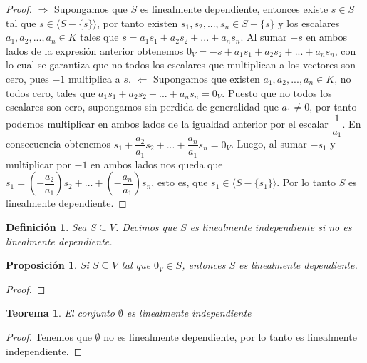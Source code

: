 \documentclass{book}
\newtheorem{theorem}{Teorema}
\newtheorem{proposition}{Proposición}
\newtheorem{definition}{Definición}
\begin{document}
\begin{proof}
$\Rightarrow$ Supongamos que $S$ es linealmente dependiente, entonces existe $s \in S$ tal que $s \in \langle S-\{ s \} \rangle$, por tanto existen $s_1,s_2,...,s_n \in S-\{s\}$ y los escalares $a_1,a_2,...,a_n \in K$ tales que $s=a_1s_1+a_2s_2+...+a_ns_n$. Al sumar $-s$ en ambos lados de la expresión anterior obtenemos $0_V=-s+a_1s_1+a_2s_2+...+a_ns_n$, con lo cual se garantiza que no todos los escalares que multiplican a los vectores son cero, pues $-1$ multiplica a $s$.\newline \newline
$\Leftarrow$ Supongamos que existen $a_1,a_2,...,a_n \in K$, no todos cero, tales que $a_1s_1+a_2s_2+...+a_ns_n=0_V$. Puesto que no todos los escalares son cero, supongamos sin perdida de generalidad que $a_1\neq 0$, por tanto podemos multiplicar en ambos lados de la igualdad anterior por el escalar $\dfrac{1}{a_1}$. En consecuencia obtenemos $s_1+\dfrac{a_2}{a_1}s_2+...+\dfrac{a_n}{a_1} s_n=0_V$. Luego, al sumar $-s_1$ y multiplicar por $-1$ en ambos lados nos queda que $s_1=\left(-\dfrac{a_2}{a_1}\right) s_2+...+\left( - \dfrac{a_n}{a_1}\right) s_n$, esto es, que $s_1 \in \langle S -\{ s_1 \} \rangle$. Por lo tanto $S$ es linealmente dependiente.
\end{proof}

\begin{definition}
Sea $S \subseteq V$. Decimos que $S$ es linealmente independiente si no es linealmente dependiente.
\end{definition}

\begin{proposition}
Si $S \subseteq V$ tal que $0_V \in S$, entonces $S$ es linealmente dependiente.
\end{proposition}

\begin{proof}

\end{proof}

\begin{theorem}
El conjunto $\emptyset$ es linealmente independiente
\end{theorem}

\begin{proof}
Tenemos que $\emptyset$ no es linealmente dependiente, por lo tanto es linealmente independiente.
\end{proof}
\end{document}
